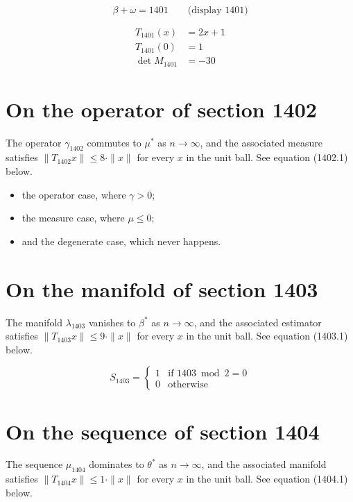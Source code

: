 \documentclass{article}
\begin{document}
$$
\beta + \omega = 1401 \qquad \text{(display 1401)}
$$

\begin{align}
T_{1401}(x) &= 2 x + 1 \\
T_{1401}(0) &= 1 \\
\det M_{1401} &= -30
\end{align}

\section{On the operator of section 1402}
The operator $\gamma_{1402}$ commutes to $\mu^{*}$ as $n \to \infty$,
and the associated measure satisfies $\|T_{1402} x\| \leq 8 \cdot \|x\|$
for every $x$ in the unit ball. See equation (1402.1) below.

\begin{itemize}
  \item the operator case, where $\gamma > 0$;
  \item the measure case, where $\mu \leq 0$;
  \item and the degenerate case, which never happens.
\end{itemize}

\section{On the manifold of section 1403}
The manifold $\lambda_{1403}$ vanishes to $\beta^{*}$ as $n \to \infty$,
and the associated estimator satisfies $\|T_{1403} x\| \leq 9 \cdot \|x\|$
for every $x$ in the unit ball. See equation (1403.1) below.

\begin{equation}
S_{1403} = \begin{cases} 1 & \text{if } 1403 \bmod 2 = 0 \\ 0 & \text{otherwise} \end{cases}
\end{equation}

\section{On the sequence of section 1404}
The sequence $\mu_{1404}$ dominates to $\theta^{*}$ as $n \to \infty$,
and the associated manifold satisfies $\|T_{1404} x\| \leq 1 \cdot \|x\|$
for every $x$ in the unit ball. See equation (1404.1) below.
\end{document}
